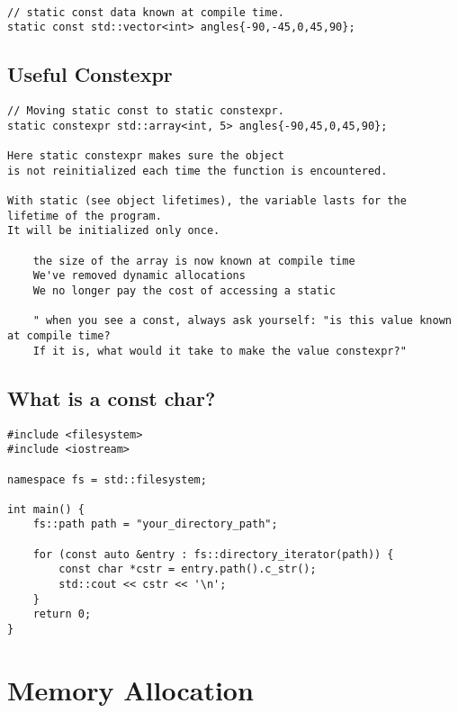 \documentclass[openany]{report}
\begin{document}
\begin{verbatim}

// static const data known at compile time. 
static const std::vector<int> angles{-90,-45,0,45,90};
\end{verbatim}

\subsection{Useful Constexpr}

\begin{verbatim}
// Moving static const to static constexpr.
static constexpr std::array<int, 5> angles{-90,45,0,45,90};

Here static constexpr makes sure the object
is not reinitialized each time the function is encountered.

With static (see object lifetimes), the variable lasts for the lifetime of the program.
It will be initialized only once. 

    the size of the array is now known at compile time
    We've removed dynamic allocations
    We no longer pay the cost of accessing a static

    " when you see a const, always ask yourself: "is this value known at compile time? 
    If it is, what would it take to make the value constexpr?" 
\end{verbatim}

\subsection{What is a const char?}

\begin{verbatim}
#include <filesystem>
#include <iostream>

namespace fs = std::filesystem;

int main() {
    fs::path path = "your_directory_path";

    for (const auto &entry : fs::directory_iterator(path)) {
        const char *cstr = entry.path().c_str();
        std::cout << cstr << '\n';
    }
    return 0;
}
\end{verbatim}

\section{Memory Allocation}
\end{document}

